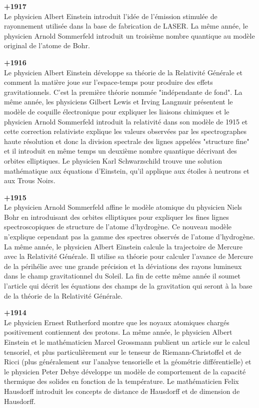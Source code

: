 \textbf{+1917}\\
Le physicien Albert Einstein introduit l'idée de l'émission stimulée de rayonnement utilisée dans la base de fabrication de LASER. La même année, le physicien Arnold Sommerfeld introduit un troisième nombre quantique au modèle original de l'atome de Bohr.

\textbf{+1916}\\
Le physicien Albert Einstein développe sa théorie de la Relativité Générale et comment la matière joue sur l'espace-temps pour produire des effets gravitationnels. C'est la première théorie nommée "indépendante de fond". La même année, les physiciens Gilbert Lewis et Irving Langmuir présentent le modèle de coquille électronique pour expliquer les liaisons chimiques et le physicien Arnold Sommerfeld introduit la relativité dans son modèle de 1915 et cette correction relativiste explique les valeurs observées par les spectrographes haute résolution et donc la division spectrale des lignes appelées "structure fine" et il introduit en même temps un deuxième nombre quantique décrivant des orbites elliptiques. Le physicien Karl Schwarzschild trouve une solution mathématique aux équations d'Einstein, qu'il applique aux étoiles à neutrons et aux Trous Noirs.

\textbf{+1915}\\
Le physicien Arnold Sommerfeld affine le modèle atomique du physicien Niels Bohr en introduisant des orbites elliptiques pour expliquer les fines lignes spectroscopiques de structure de l'atome d'hydrogène. Ce nouveau modèle n'explique cependant pas la gamme des spectres observés de l'atome d'hydrogène. La même année, le physicien Albert Einstein calcule la trajectoire de Mercure avec la Relativité Générale. Il utilise sa théorie pour calculer l'avance de Mercure de la périhélie avec une grande précision et la déviations des rayons lumineux dans le champ gravitationnel du Soleil. La fin de cette même année il soumet l'article qui décrit les équations des champs de la gravitation qui seront à la base de la théorie de la Relativité Générale.

\textbf{+1914}\\
Le physicien Ernest Rutherford montre que les noyaux atomiques chargés positivement contiennent des protons. La même année, le physicien Albert Einstein et le mathématicien Marcel Grossmann publient un article sur le calcul tensoriel, et plus particulièrement sur le tenseur de Riemann-Christoffel et de Ricci (plus généralement sur l'analyse tensorielle et la géométrie différentielle) et le physicien Peter Debye développe un modèle de comportement de la capacité thermique des solides en fonction de la température. Le mathématicien Felix Hausdorff introduit les concepts de distance de Hausdorff et de dimension de Hausdorff.

